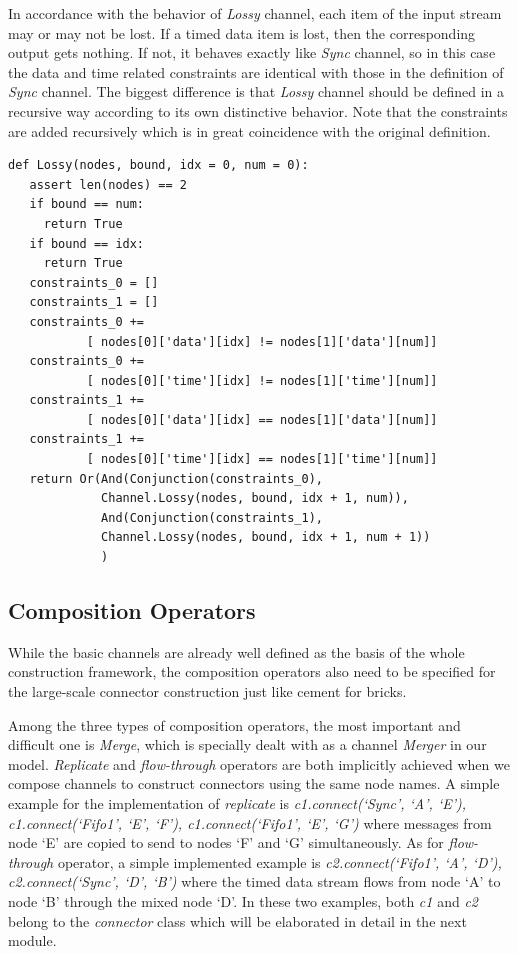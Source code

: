 \documentclass[preprint,3p]{elsarticle}
\begin{document}
In accordance with the behavior of \emph{Lossy} channel, each item of the input stream may or may not be lost. If a timed data item is lost, then the corresponding output gets nothing. If not, it behaves exactly like \emph{Sync} channel, so in this case the data and time related constraints are identical with those in the definition of \emph{Sync} channel. The biggest difference is that \emph{Lossy} channel should be defined in a recursive way according to its own distinctive behavior. Note that the constraints are added recursively which is in great coincidence with the original definition.
\begin{lstlisting}[frame=single]
def Lossy(nodes, bound, idx = 0, num = 0):
   assert len(nodes) == 2
   if bound == num:
     return True
   if bound == idx:
     return True
   constraints_0 = []
   constraints_1 = []
   constraints_0 +=
           [ nodes[0]['data'][idx] != nodes[1]['data'][num]]
   constraints_0 +=
           [ nodes[0]['time'][idx] != nodes[1]['time'][num]]
   constraints_1 +=
           [ nodes[0]['data'][idx] == nodes[1]['data'][num]]
   constraints_1 +=
           [ nodes[0]['time'][idx] == nodes[1]['time'][num]]
   return Or(And(Conjunction(constraints_0),
             Channel.Lossy(nodes, bound, idx + 1, num)),
             And(Conjunction(constraints_1),
             Channel.Lossy(nodes, bound, idx + 1, num + 1))
             )
\end{lstlisting}
\subsection{Composition Operators}
While the basic channels are already well defined as the basis of the whole construction framework, the composition operators also need to be specified for the large-scale connector construction just like cement for bricks.

Among the three types of composition operators, the most important and difficult one is \emph{Merge}, which is specially dealt with as a channel \emph{Merger} in our model. \emph{Replicate} and \emph{flow-through} operators are both implicitly achieved when we compose channels to construct connectors using the same node names. A simple example for the implementation of \emph{replicate} is \emph{c1.connect(`Sync', `A', `E'), c1.connect(`Fifo1', `E', `F'), c1.connect(`Fifo1', `E', `G')} where messages from node `E' are copied to send to nodes `F' and `G' simultaneously. As for \emph{flow-through} operator, a simple implemented example is \emph{c2.connect(`Fifo1', `A', `D'), c2.connect(`Sync', `D', `B')} where the timed data stream flows from node `A' to node `B' through the mixed node `D'. In these two examples, both \emph{c1} and \emph{c2} belong to the \emph{connector} class which will be elaborated in detail in the next module.
\end{document}
